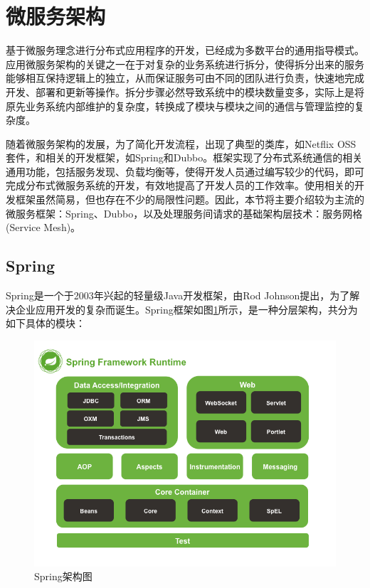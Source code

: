 \documentclass[macfonts,master]{njuthesis}
\begin{document}
\section{微服务架构}
基于微服务理念进行分布式应用程序的开发，已经成为多数平台的通用指导模式\cite{newman2015building,nadareishvili2016microservice}。应用微服务架构的关键之一在于对复杂的业务系统进行拆分，使得拆分出来的服务能够相互保持逻辑上的独立，从而保证服务可由不同的团队进行负责，快速地完成开发、部署和更新等操作。拆分步骤必然导致系统中的模块数量变多，实际上是将原先业务系统内部维护的复杂度，转换成了模块与模块之间的通信与管理监控的复杂度。

随着微服务架构的发展，为了简化开发流程，出现了典型的类库，如Netflix OSS\cite{NetflixOSS}套件，和相关的开发框架，如Spring和Dubbo。框架实现了分布式系统通信的相关通用功能，包括服务发现、负载均衡等，使得开发人员通过编写较少的代码，即可完成分布式微服务系统的开发，有效地提高了开发人员的工作效率。使用相关的开发框架虽然简易，但也存在不少的局限性问题。因此，本节将主要介绍较为主流的微服务框架：Spring、Dubbo，以及处理服务间请求的基础架构层技术：服务网格(Service Mesh)。

\subsection{Spring}
Spring是一个于2003年兴起的轻量级Java开发框架，由Rod Johnson提出，为了解决企业应用开发的复杂而诞生\cite{johnson2004spring}。Spring框架如图\ref{fig:spring_overview}所示，是一种分层架构，共分为如下具体的模块：\\

\begin{figure}[!htbp]
  \centering
  \includegraphics[width= 1.0\textwidth]{image/spring_overview.png}
  \caption{Spring架构图}
  \label{fig:spring_overview}
\end{figure}
\end{document}
